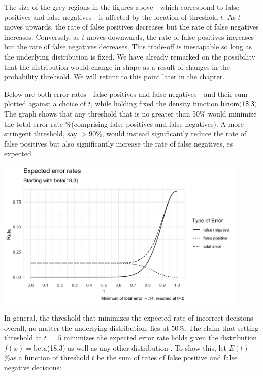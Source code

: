 \documentclass[10pt,dvipsnames,enabledeprecatedfontcommands]{scrartcl}
\begin{document}
The size of the grey regions in the figures above---which correspond to
false positives and false negatives---is affected by the location of
threshold \(t\). As \(t\) moves upwards, the rate of false positives
decreases but the rate of false negatives increases. Conversely, as
\(t\) moves downwards, the rate of false positives increases but the
rate of false negatives decreases. This trade-off is inescapable so long
as the underlying distribution is fixed. We have already remarked on the
possibility that the distribution would change in shape as a result of
changes in the probability threhsold. We will retunr to this point later
in the chapter.

Below are both error rates---false positives and false negatives---and
their sum plotted against a choice of \(t\), while holding fixed the
density function \(\textsf{binom(18,3)}\). The graph shows that any
threshold that is no greater than 50\% would minimize the total error
rate \%(comprising false positives and false negatives). A more
stringent threshold, say \(>90\%\), would instead significantly reduce
the rate of false positives but also significantly increase the rate of
false negatives, es expected.

\begin{center}
    \includegraphics[width=12cm]{errors.png}
\end{center}

In general, the threshold that minimizes the expected rate of incorrect
decisions overall, no matter the underlying distribution, lies at
\(50\%\). The claim that setting threshold at \(t=.5\) minimizes the
expected error rate holds given the distribution \(f(x)=\)beta(18,3) as
well as any other distribution
\citep{kaye1982limits, Kaye1999Clarifying-the-, cheng2015}. To show
this, let \(E(t)\) \%as a function of threshold \(t\) be the sum of
rates of false positive and false negative decisions:
\end{document}
